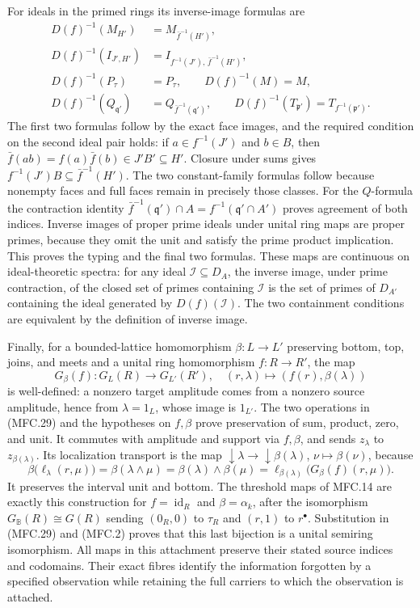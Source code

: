 For ideals in the primed rings its inverse-image formulas are
\[
 \begin{aligned}
 D(f)^{-1}(M_{H'})&=M_{\bar f^{-1}(H')},\\
 D(f)^{-1}(I_{J',H'})&=I_{f^{-1}(J'),\,\bar f^{-1}(H')},\\
 D(f)^{-1}(P_\tau)&=P_\tau,\qquad D(f)^{-1}(M)=M,\\
 D(f)^{-1}(Q_{\mathfrak q'})
      &=Q_{\bar f^{-1}(\mathfrak q')},\qquad
 D(f)^{-1}(T_{\mathfrak p'})
      =T_{f^{-1}(\mathfrak p')}.
 \end{aligned}                                           \tag{MFC.47}
\]
The first two formulas follow by the exact face images,
and the required condition on the second ideal pair holds:
if \(a\in f^{-1}(J')\) and \(b\in B\), then
\(\bar f(ab)=f(a)\bar f(b)\in J'B'\subseteq H'\).
Closure under sums gives
\(f^{-1}(J')B\subseteq\bar f^{-1}(H')\).
The two constant-family formulas follow because nonempty
faces and full faces remain in precisely those classes.
For the \(Q\)-formula the contraction identity
\(\bar f^{-1}(\mathfrak q')\cap A
=f^{-1}(\mathfrak q'\cap A')\) proves agreement of both
indices. Inverse images of proper prime ideals under
unital ring maps are proper primes, because they omit
the unit and satisfy the prime product implication.
This proves the typing and the final two formulas.
These maps are continuous on ideal-theoretic spectra:
for any ideal \(\mathcal I\subseteq D_A\), the inverse
image, under prime contraction, of the closed set of
primes containing \(\mathcal I\) is the set of primes
of \(D_{A'}\) containing the ideal generated by
\(D(f)(\mathcal I)\). The two containment conditions
are equivalent by the definition of inverse image.

Finally, for a bounded-lattice homomorphism
\(\beta:L\to L'\) preserving bottom, top, joins, and meets and a
unital ring homomorphism \(f:R\to R'\), the map
\[
 G_\beta(f):G_L(R)\to G_{L'}(R'),\quad
 (r,\lambda)\mapsto(f(r),\beta(\lambda))                  \tag{MFC.48}
\]
is well-defined: a nonzero target amplitude comes
from a nonzero source amplitude, hence from
\(\lambda=1_L\), whose image is \(1_{L'}\).
The two operations in (MFC.29) and the hypotheses
on \(f,\beta\) prove preservation of sum, product,
zero, and unit. It commutes with amplitude and
support via \(f,\beta\), and sends \(z_\lambda\)
to \(z_{\beta(\lambda)}\).
Its localization transport is the map
\(\downarrow\lambda\to\downarrow\beta(\lambda)\),
\(\nu\mapsto\beta(\nu)\), because
\[
 \beta\bigl(\ell_\lambda(r,\mu)\bigr)
 =\beta(\lambda\wedge\mu)
 =\beta(\lambda)\wedge\beta(\mu)
 =\ell_{\beta(\lambda)}
       \bigl(G_\beta(f)(r,\mu)\bigr).                      \tag{MFC.49}
\]
It preserves the interval unit and bottom.
The threshold maps of MFC.14 are exactly this
construction for \(f=\operatorname{id}_R\) and
\(\beta=\alpha_k\), after the isomorphism
\(G_{\mathbb B}(R)\cong G(R)\) sending
\((0_R,0)\) to \(\tau_R\) and \((r,1)\) to
\(r^\bullet\). Substitution in (MFC.29) and (MFC.2)
proves that this last bijection is a unital
semiring isomorphism.
All maps in this attachment preserve their stated
source indices and codomains. Their exact fibres
identify the information forgotten by a specified
observation while retaining the full carriers to
which the observation is attached.
